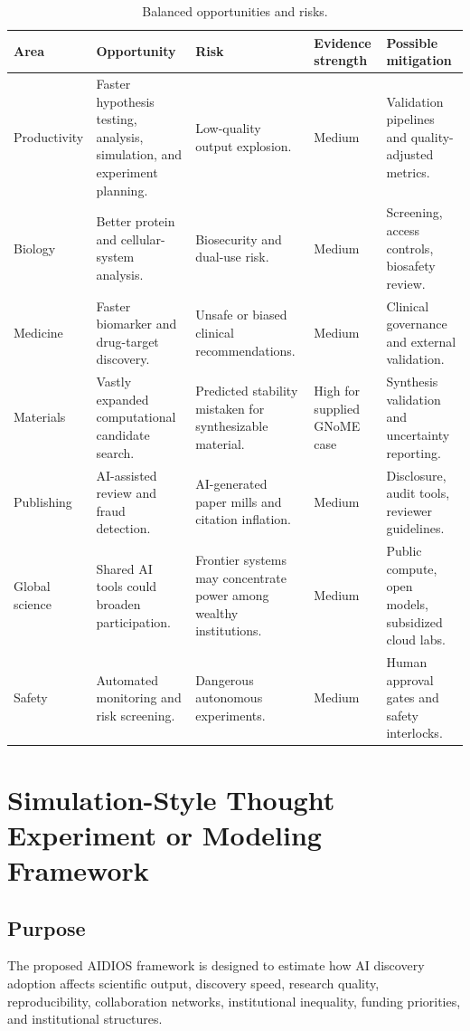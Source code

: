 \documentclass[12pt]{article}
\begin{document}
\begin{table}[H]
\centering
\caption{Balanced opportunities and risks.}
\small
\begin{tabularx}{\textwidth}{p{2.4cm}X X p{2.1cm}X}
\toprule
\textbf{Area} & \textbf{Opportunity} & \textbf{Risk} & \textbf{Evidence strength} & \textbf{Possible mitigation} \\
\midrule
Productivity & Faster hypothesis testing, analysis, simulation, and experiment planning. & Low-quality output explosion. & Medium & Validation pipelines and quality-adjusted metrics. \\
Biology & Better protein and cellular-system analysis. & Biosecurity and dual-use risk. & Medium & Screening, access controls, biosafety review. \\
Medicine & Faster biomarker and drug-target discovery. & Unsafe or biased clinical recommendations. & Medium & Clinical governance and external validation. \\
Materials & Vastly expanded computational candidate search. & Predicted stability mistaken for synthesizable material. & High for supplied GNoME case & Synthesis validation and uncertainty reporting. \\
Publishing & AI-assisted review and fraud detection. & AI-generated paper mills and citation inflation. & Medium & Disclosure, audit tools, reviewer guidelines. \\
Global science & Shared AI tools could broaden participation. & Frontier systems may concentrate power among wealthy institutions. & Medium & Public compute, open models, subsidized cloud labs. \\
Safety & Automated monitoring and risk screening. & Dangerous autonomous experiments. & Medium & Human approval gates and safety interlocks. \\
\bottomrule
\end{tabularx}
\end{table}

\section{Simulation-Style Thought Experiment or Modeling Framework}

\subsection{Purpose}

The proposed AIDIOS framework is designed to estimate how AI discovery adoption affects scientific output, discovery speed, research quality, reproducibility, collaboration networks, institutional inequality, funding priorities, and institutional structures.
\end{document}
